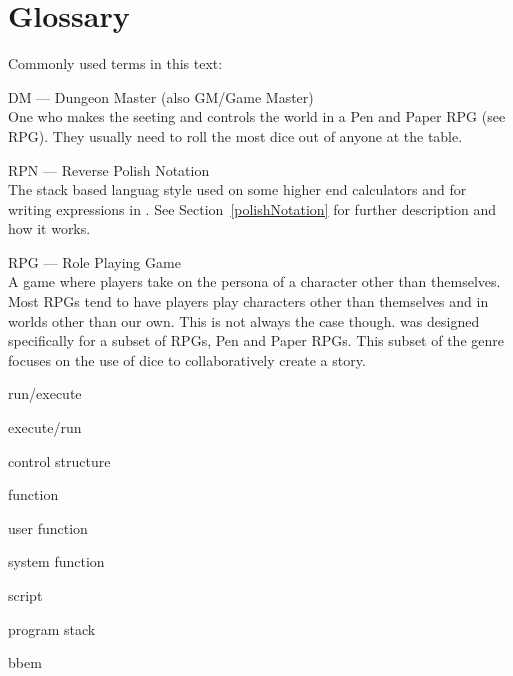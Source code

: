 \chapter{Glossary}
\label{glossary}
Commonly used terms in this text:

\noindent \hangindent=1cm
DM --- Dungeon Master (also GM/Game Master)\\
 
One who makes the seeting and controls the world in a Pen and Paper RPG
(see RPG). They usually need to roll the most dice out of anyone at the table.

\noindent \hangindent=1cm
RPN --- Reverse Polish Notation\\
The stack based languag style used on some higher end calculators and for
writing expressions in \progLogo. See Section~\ref{polishNotation} for further
description and how it works.

\noindent \hangindent=1cm
RPG --- Role Playing Game\\
A game where players take on the persona of a character other than themselves.
Most RPGs tend to have players play characters other than themselves and in 
worlds other than our own. This is not always the case though. \progLogo was
designed specifically for a subset of RPGs, Pen and Paper RPGs. This subset
of the genre focuses on the use of dice to collaboratively create a story.

run/execute

execute/run

control structure

function

user function

system function

script

program stack

bbem


